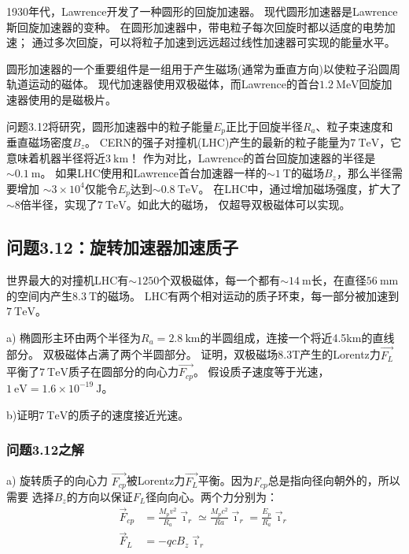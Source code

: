 1930年代，Lawrence开发了一种圆形的回旋加速器。
现代圆形加速器是Lawrence斯回旋加速器的变种。
在圆形加速器中，带电粒子每次回旋时都以适度的电势加速；
通过多次回旋，可以将粒子加速到远远超过线性加速器可实现的能量水平。

圆形加速器的一个重要组件是一组用于产生磁场(通常为垂直方向)以使粒子沿圆周轨道运动的磁体。
现代加速器使用双极磁体，而Lawrence的首台$1.2\ \mathrm{MeV}$回旋加速器使用的是磁极片。

问题3.12将研究，圆形加速器中的粒子能量$E_p$正比于回旋半径$R_a$、粒子束速度和垂直磁场密度$B_z$。
CERN的强子对撞机(LHC)产生的最新的粒子能量为$7\ \mathrm{TeV}$，它意味着机器半径将近$3\ \mathrm{km}$！
作为对比，Lawrence的首台回旋加速器的半径是$\sim 0.1\ \mathrm{m}$。
如果LHC使用和Lawrence首台加速器一样的$\sim 1\ \mathrm{T}$的磁场$B_z$，那么半径需要增加
$\sim 3\times 10^4$仅能令$E_p$达到$\sim 0.8\ \mathrm{TeV}$。
在LHC中，通过增加磁场强度，扩大了$\sim 8$倍半径，实现了$7\ \mathrm{TeV}$。如此大的磁场，
仅超导双极磁体可以实现。


\subsection{问题3.12：旋转加速器加速质子}
世界最大的对撞机LHC有$\sim 1250$个双极磁体，每一个都有$\sim 14 \ \mathrm{m}$长，在直径$56\ \mathrm{mm}$的空间内产生$8.3\ \mathrm{T}$的磁场。
LHC有两个相对运动的质子环束，每一部分被加速到$7\ \mathrm{TeV}$。

a) 椭圆形主环由两个半径为$R_a=2.8 \ \mathrm{km}$的半圆组成，连接一个将近4.5km的直线部分。
双极磁体占满了两个半圆部分。
证明，双极磁场8.3T产生的Lorentz力$\vec{F_L}$平衡了$7\ \mathrm{TeV}$质子在圆部分的向心力$\vec{F_{cp}}$。
假设质子速度等于光速，$1\ \mathrm{eV}= 1.6\times 10^{−19}\ \mathrm{J}$。

b)证明$7\ \mathrm{TeV}$的质子的速度接近光速。

\subsubsection{问题3.12之解}
a) 旋转质子的向心力 $\vec{F_{cp}}$被Lorentz力$\vec{F_L}$平衡。因为$F_{cp}$总是指向径向朝外的，所以需要
选择$B_z$的方向以保证$F_L$径向向心。两个力分别为：
\begin{align*}
\vec{F}_{cp}&=\frac{M_{p}v^{2}}{R_{a}}\vec{\imath}_{r}\simeq\frac{M_{p}c^{2}}{Ra}\vec{\imath}_{r}=\frac{E_{p}}{R_{a}}\vec{\imath}_{r}\tag{S12.1a}\\%
\vec{F}_{L}&=-qcB_{z}\vec{\imath}_{r}\tag{S12.1b}%
\end{align*}

